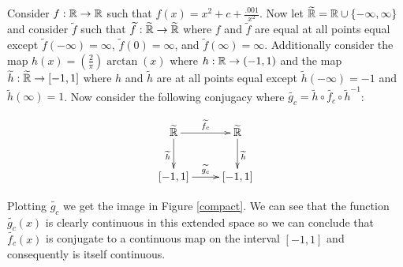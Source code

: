 			\begin{myproof}
				Consider $f: \mathbb{R} \rightarrow \mathbb{R}$ such that $f (x) = x^2 + c + \frac{.001}{x^2}$. Now let $\widetilde{\mathbb{R}} = \mathbb{R} \cup \{-\infty, \infty\}$ and consider $\widetilde{f}$ such that $\widetilde{f}:\widetilde{\mathbb{R}} \rightarrow \widetilde{\mathbb{R}}$ where $f$ and $\widetilde{f}$ are equal at all points equal except $\widetilde{f} (-\infty) = \infty$, $\widetilde{f} (0) = \infty$, and $\widetilde{f} (\infty) = \infty$. Additionally consider the map $h (x) = \left (\frac{2}{\pi}\right)\arctan (x)$ where $h : \mathbb{R} \rightarrow (-1,1)$ and the map $\widetilde{h} : \widetilde{\mathbb{R}} \rightarrow [-1,1]$ where $h$ and $\widetilde{h}$ are at all points equal except $\widetilde{h} (-\infty) = -1$ and $\widetilde{h} (\infty) = 1$. Now consider the following conjugacy where $\widetilde{g_c} = \widetilde{h}\circ\widetilde{f_c}\circ \widetilde{h}^{-1}$:

				\begin{displaymath}
					\xymatrix
					{
						\widetilde{\R} \ar@{->}[r]^{\widetilde{f_c}}\ar@{->}[d]_{\widetilde{h}} & \widetilde{\R} \ar@{->}[d]^{\widetilde{h}}\\
						[-1,1] \ar@{->}[r]^{\widetilde{g_c}} & [-1,1]
					}
				\end{displaymath}

				Plotting $\widetilde{g_c}$ we get the image in Figure \ref{compact}. We can see that the function $\widetilde{g_c} (x)$ is clearly continuous in this extended space so we can conclude that $\widetilde{f_c} (x)$ is conjugate to a continuous map on the interval $[-1,1]$ and consequently is itself continuous.


\end{myproof}
